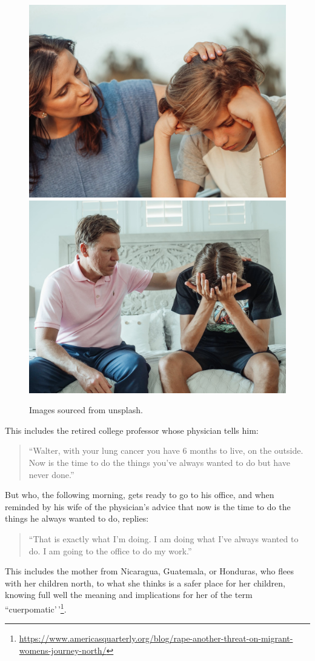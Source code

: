 \documentclass[
]{book}
\begin{document}
\begin{figure}

{\centering \includegraphics[width=0.45\linewidth]{img/intro/sadparentandchild} \includegraphics[width=0.45\linewidth]{img/intro/saddadandchild} 

}

\caption{Images sourced from unsplash.}\label{fig:intro05}
\end{figure}

This includes the retired college professor whose physician tells him:

\begin{quote}
``Walter, with your lung cancer you have 6 months to live, on the outside. Now is the time to do the things you've always wanted to do but have never done.''
\end{quote}

But who, the following morning, gets ready to go to his office, and when reminded by his wife of the physician's advice that now is the time to do the things he always wanted to do, replies:

\begin{quote}
``That is exactly what I'm doing. I am doing what I've always wanted to do. I am going to the office to do my work.''
\end{quote}

This includes the mother from Nicaragua, Guatemala, or Honduras, who flees with her children north, to what she thinks is a safer place for her children, knowing full well the meaning and implications for her of the term ``cuerpomatic'\,'\footnote{\url{https://www.americasquarterly.org/blog/rape-another-threat-on-migrant-womens-journey-north/}}.
\end{document}
